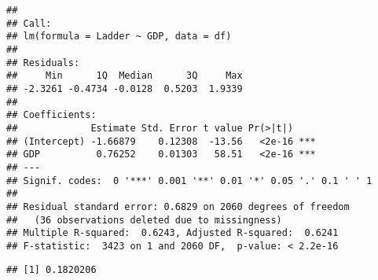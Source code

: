 \documentclass[
]{article}
\newenvironment{Shaded}{\begin{snugshade}}{\end{snugshade}}
\newcommand{\AttributeTok}[1]{\textcolor[rgb]{0.77,0.63,0.00}{#1}}
\newcommand{\ControlFlowTok}[1]{\textcolor[rgb]{0.13,0.29,0.53}{\textbf{#1}}}
\newcommand{\DecValTok}[1]{\textcolor[rgb]{0.00,0.00,0.81}{#1}}
\newcommand{\FloatTok}[1]{\textcolor[rgb]{0.00,0.00,0.81}{#1}}
\newcommand{\FunctionTok}[1]{\textcolor[rgb]{0.00,0.00,0.00}{#1}}
\newcommand{\NormalTok}[1]{#1}
\newcommand{\OtherTok}[1]{\textcolor[rgb]{0.56,0.35,0.01}{#1}}
\newcommand{\SpecialCharTok}[1]{\textcolor[rgb]{0.00,0.00,0.00}{#1}}
\begin{document}
\begin{verbatim}
## 
## Call:
## lm(formula = Ladder ~ GDP, data = df)
## 
## Residuals:
##     Min      1Q  Median      3Q     Max 
## -2.3261 -0.4734 -0.0128  0.5203  1.9339 
## 
## Coefficients:
##             Estimate Std. Error t value Pr(>|t|)    
## (Intercept) -1.66879    0.12308  -13.56   <2e-16 ***
## GDP          0.76252    0.01303   58.51   <2e-16 ***
## ---
## Signif. codes:  0 '***' 0.001 '**' 0.01 '*' 0.05 '.' 0.1 ' ' 1
## 
## Residual standard error: 0.6829 on 2060 degrees of freedom
##   (36 observations deleted due to missingness)
## Multiple R-squared:  0.6243, Adjusted R-squared:  0.6241 
## F-statistic:  3423 on 1 and 2060 DF,  p-value: < 2.2e-16
\end{verbatim}

\begin{Shaded}
\end{Shaded}

\begin{verbatim}
## [1] 0.1820206
\end{verbatim}
\end{document}
